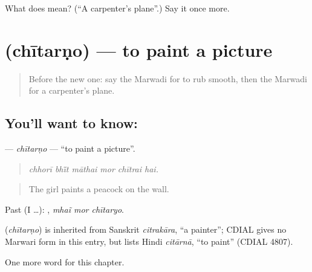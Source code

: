 \begin{tcolorbox}[breakable,colback=teal!4,colframe=teal!35!black,title={Before you move on}]
What does  mean? (\textquotedblleft{}A carpenter's plane\textquotedblright{}.) Say it once more.
\end{tcolorbox}
\section[\texorpdfstring{\mw{चीतरणो} (chītarṇo)}{चीतरणो (chītarṇo)}]{ (chītarṇo) — to paint a picture}

\label{lesson:MW-C289-chitarno}



\begin{quote}
Before the new one: say the Marwadi for to rub smooth, then the Marwadi for a carpenter's plane.
\end{quote}

\subsection*{You'll want to know: }
\textbf{} — \emph{chītarṇo} — \textquotedblleft{}to paint a picture\textquotedblright{}.

\begin{quote}
     
\end{quote}

\begin{quote}
\emph{chhorī bhī̃t māthai mor chītrai hai.}
\end{quote}

\begin{quote}
The girl paints a peacock on the wall.
\end{quote}

Past (I …):   , \emph{mhaĩ mor chītaryo}.

\begin{cousinweb}
\textbf{} (\emph{chītarṇo}) is inherited from Sanskrit \emph{citrakāra}, \textquotedblleft{}a painter\textquotedblright{}; CDIAL gives no Marwari form in this entry, but lists Hindi \emph{citārnā}, \textquotedblleft{}to paint\textquotedblright{} (CDIAL 4807).
\end{cousinweb}

\begin{grammarlens}[title={What you've built}]
One more word for this chapter.
\end{grammarlens}

